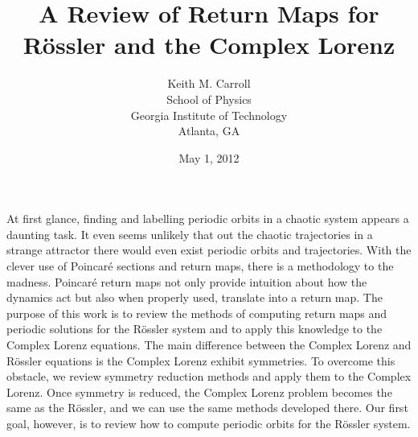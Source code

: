 \documentclass[12 pt]{article}
\begin{document}
\title{A Review of Return Maps for R\"ossler and the Complex Lorenz}
\author{Keith M. Carroll\\ School of Physics \\ Georgia Institute of Technology \\ Atlanta, GA}
\date{May 1, 2012}
\maketitle
At first glance, finding and labelling periodic orbits in a chaotic
system appears a daunting task.  It even seems unlikely that out the
chaotic trajectories in a strange attractor there would even exist
periodic orbits and trajectories.  With the clever use of Poincar\'e
sections and return maps, there is a methodology to the madness.
Poincar\'e return maps not only provide intuition about how the dynamics act but
also when properly used, translate into a return map.  The purpose of
this work is to review the methods of computing return maps and periodic
solutions for the R\"ossler system and to apply this knowledge to the
Complex Lorenz equations.  The main difference between the Complex Lorenz
and R\"ossler equations is the Complex Lorenz exhibit symmetries.  To
overcome this obstacle, we review symmetry reduction methods and apply
them to the Complex Lorenz.  Once symmetry is reduced, the Complex Lorenz
problem becomes the same as the R\"ossler, and we can use the same
methods developed there.  Our first goal, however, is to review how to
compute periodic orbits for the R\"ossler system.
\end{document}
